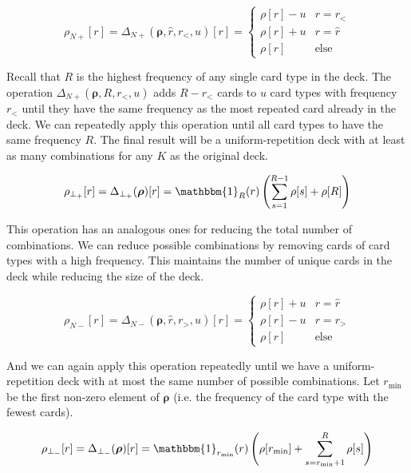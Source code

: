 \documentclass{article}
\begin{document}
\begin{equation}
    \rho_{N+}[r] = \Delta_{N+}(\bm{\rho}, \hat{r}, r_<, u)[r] = \begin{cases} 
      \rho[r] - u & r=r_< \\
      \rho[r] + u & r=\hat{r} \\
      \rho[r] & \text{else} 
   \end{cases}
\end{equation}

Recall that $R$ is the highest frequency of any single card type in the deck. The operation $\Delta_{N+}(\bm{\rho}, R, r_<, u)$ adds $R - r_<$ cards to $u$ card types with frequency $r_<$ until they have the same frequency as the most repeated card already in the deck. We can repeatedly apply this operation until all card types to have the same frequency $R$. The final result will be a uniform-repetition deck with at least as many combinations for any $K$ as the original deck.

\begin{equation}
    \rho_{\bot_+}[r] = \Delta_{\bot_+}(\bm{\rho})[r]  = \mathbbm{1}_{R}(r) \left (\sum_{s=1}^{R - 1} \rho[s] +\rho[R] \right )
\end{equation}

This operation has an analogous ones for reducing the total number of combinations. We can reduce possible combinations by removing cards of card types with a high frequency. This maintains the number of unique cards in the deck while reducing the size of the deck. 

\begin{equation}
    \rho_{N-}[r] = \Delta_{N-}(\bm{\rho}, \hat{r}, r_>, u)[r]  = \begin{cases} 
      \rho[r] + u & r=\hat{r} \\
      \rho[r] - u & r=r_> \\
      \rho[r] & \text{else} 
   \end{cases}
\end{equation}

And we can again apply this operation repeatedly until we have a uniform-repetition deck with at most the same number of possible combinations. Let $r_{\min}$ be the first non-zero element of $\bm{\rho}$ (i.e. the frequency of the card type with the fewest cards).

\begin{equation}
    \rho_{\bot_-}[r] = \Delta_{\bot_-}(\bm{\rho})[r]  = \mathbbm{1}_{r_{\min}}(r) \left (\rho[r_{\min}] + \sum_{s=r_{\min}+1}^{R} \rho[s] \right )
\end{equation}
\end{document}
